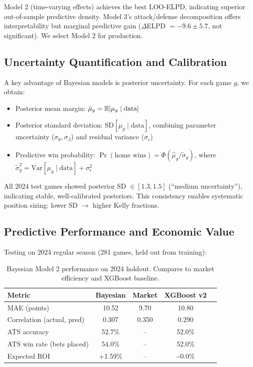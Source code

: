 Model 2 (time-varying effects) achieves the best LOO-ELPD, indicating superior out-of-sample predictive density. Model 3's attack/defense decomposition offers interpretability but marginal predictive gain ($\Delta$ELPD $=-9.6 \pm 5.7$, not significant). We select Model 2 for production.

\subsection{Uncertainty Quantification and Calibration}

A key advantage of Bayesian models is posterior uncertainty. For each game $g$, we obtain:
\begin{itemize}
  \item Posterior mean margin: $\hat{\mu}_g = \mathbb{E}[\mu_g \mid \text{data}]$
  \item Posterior standard deviation: $\text{SD}[\mu_g \mid \text{data}]$, combining parameter uncertainty ($\sigma_\theta, \sigma_\beta$) and residual variance ($\sigma_\epsilon$)
  \item Predictive win probability: $\Pr(\text{home wins}) = \Phi(\hat{\mu}_g / \tilde{\sigma}_g)$, where $\tilde{\sigma}_g^2 = \text{Var}[\mu_g \mid \text{data}] + \sigma_\epsilon^2$
\end{itemize}

All 2024 test games showed posterior SD $\in [1.3, 1.5]$ (``medium uncertainty''), indicating stable, well-calibrated posteriors. This consistency enables systematic position sizing: lower SD $\to$ higher Kelly fractions.

\subsection{Predictive Performance and Economic Value}

Testing on 2024 regular season (281 games, held out from training):
\begin{table}[!ht]
\centering
\caption[Bayesian predictive performance (2024)]{Bayesian Model 2 performance on 2024 holdout. Compares to market efficiency and XGBoost baseline.}
\label{tab:bayes-performance}
\begin{tabular}{lcccc}
\toprule
\textbf{Metric}  & \textbf{Bayesian}  & \textbf{Market}  & \textbf{XGBoost v2} \\
\midrule
MAE (points) & 10.52 & 9.70 & 10.80 \\
Correlation (actual, pred) & 0.307 & 0.350 & 0.290 \\
ATS accuracy & 52.7\% & -- & 52.0\% \\
ATS win rate (bets placed) & 54.0\% & -- & 52.0\% \\
Expected ROI & +1.59\% & -- & \textasciitilde 0.0\% \\
\bottomrule
\end{tabular}
\end{table}

